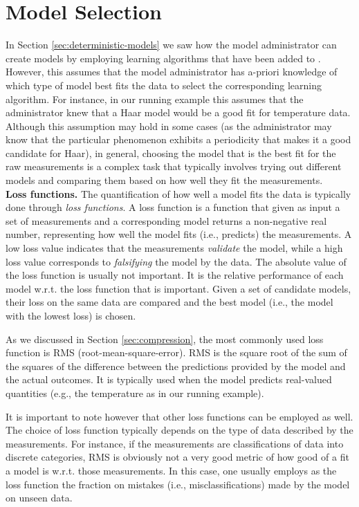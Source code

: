 \section{Model Selection}
\label{sec:model-selection}

In Section \ref{sec:deterministic-models} we saw how the model administrator
can create models by employing learning algorithms that have
been added to \projName. However, this assumes that the model
administrator has a-priori knowledge of which type of model
best fits the data to select the corresponding learning algorithm.
For instance, in our running example this assumes that the administrator
knew that a Haar model would be a good fit for temperature data.
Although this assumption may hold in some cases (as the administrator may know that the particular phenomenon exhibits a periodicity that makes it a good candidate for Haar),
in general, choosing the model that is the best fit for the raw measurements is
a complex task that typically involves trying out different models
 and comparing them based on how well they fit the
measurements.\\

{\bf Loss functions.} The quantification of how well a model fits the data is typically done through {\em loss functions}. A loss function is 
a function that given as input a set of measurements and a corresponding
model returns a non-negative real number, representing how well
the model fits (i.e., predicts) the measurements. A low loss value
indicates that the measurements {\em validate} the model, while a high loss
value corresponds to {\em falsifying} the model by the data.
The absolute value of the loss function is usually not important. It is the relative performance of each model w.r.t. the loss function that is important. Given a set of candidate models, their loss on the same data are compared and the best model (i.e., the model with the lowest loss) is chosen.

As we discussed in Section \ref{sec:compression}, the most commonly used loss function is RMS (root-mean-square-error). RMS is the square root of the sum of the squares of the difference between the predictions provided by the model and the actual outcomes. It is typically used when the model predicts real-valued quantities (e.g., the temperature as in our running example).

It is important to note however that other loss functions can be employed as well. The choice of loss function typically depends on the type of data described by the measurements. For instance, if the measurements are classifications of data into discrete categories, RMS is obviously not a very good metric of how good of a fit a model is w.r.t. those measurements. In this case, one usually employs as the loss function the fraction on mistakes (i.e., misclassifications) made by the model on unseen data.\\

